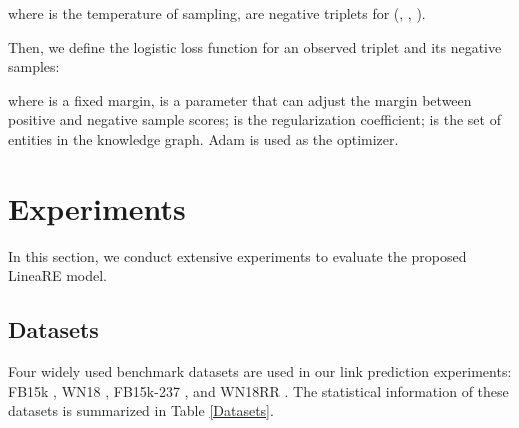 \documentclass[conference]{IEEEtran}
\begin{document}
where  is the temperature of sampling,  are negative triplets for (, , ).

Then, we define the logistic loss function for an observed triplet and its negative samples:


where  is a fixed margin,  is a parameter that can adjust the margin between positive and negative sample scores;  is the regularization coefficient;  is the set of entities in the knowledge graph. Adam \cite{Adam} is used as the optimizer.

\section{Experiments}
In this section, we conduct extensive experiments to evaluate the proposed LineaRE model.

\subsection{Datasets}
Four widely used benchmark datasets are used in our link prediction experiments: FB15k \cite{TransE}, WN18 \cite{TransE}, FB15k-237 \cite{Toutanova2015Observed}, and WN18RR \cite{ConvE}. The statistical information of these datasets is summarized in Table \ref{Datasets}.
\end{document}
